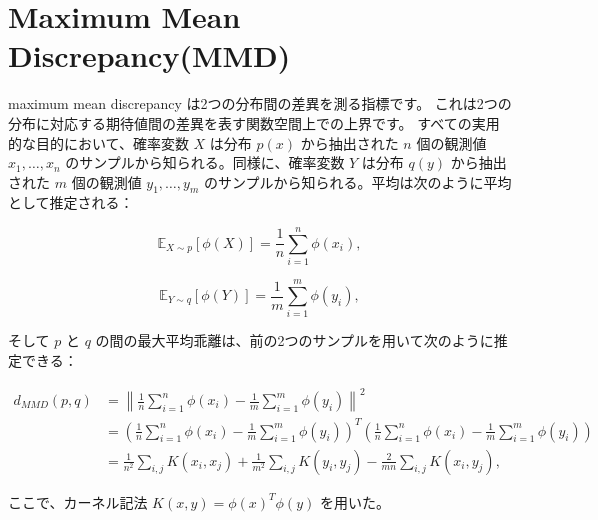 \documentclass[dvipdfmx,a4paper]{jsarticle}%
\begin{document}
\section{\textbf{Maximum Mean Discrepancy(MMD)}}
\begin{dfn}\label{def:mmd}
  maximum mean discrepancy は2つの分布間の差異を測る指標です。 これは2つの分布に対応する期待値間の差異を表す関数空間上での上界です。
すべての実用的な目的において、確率変数 $X$ は分布 $p(x)$ から抽出された $n$ 個の観測値 $x_1, \ldots, x_n$ のサンプルから知られる。同様に、確率変数 $Y$ は分布 $q(y)$ から抽出された $m$ 個の観測値 $y_1, \ldots, y_m$ のサンプルから知られる。平均は次のように平均として推定される：

$$\mathbb{E}_{X \sim p}[\phi(X)] = \frac{1}{n} \sum_{i=1}^n \phi(x_i),$$

$$\mathbb{E}_{Y \sim q}[\phi(Y)] = \frac{1}{m} \sum_{i=1}^m \phi(y_i),$$

そして $p$ と $q$ の間の最大平均乖離は、前の2つのサンプルを用いて次のように推定できる：

\begin{align*}
d_{MMD}(p, q) &= \left\|\frac{1}{n} \sum_{i=1}^n \phi(x_i) - \frac{1}{m} \sum_{i=1}^m \phi(y_i)\right\|^2 \\
&= \left(\frac{1}{n} \sum_{i=1}^n \phi(x_i) - \frac{1}{m} \sum_{i=1}^m \phi(y_i)\right)^T \left(\frac{1}{n} \sum_{i=1}^n \phi(x_i) - \frac{1}{m} \sum_{i=1}^m \phi(y_i)\right) \\
&= \frac{1}{n^2} \sum_{i,j} K(x_i, x_j) + \frac{1}{m^2} \sum_{i,j} K(y_i, y_j) - \frac{2}{mn} \sum_{i,j} K(x_i, y_j), 
\end{align*}

ここで、カーネル記法 $K(x, y) = \phi(x)^T \phi(y)$ を用いた。
\end{dfn}
\end{document}
